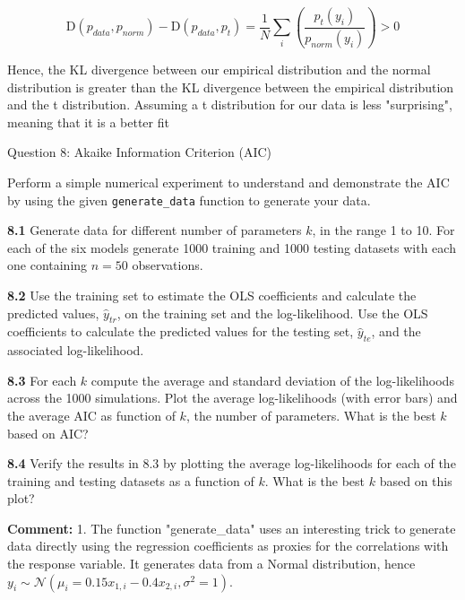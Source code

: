 \documentclass[11pt]{article}
\begin{document}
\[
\text{D}(p_{data},p_{norm}) - \text{D}(p_{data},p_t) = \frac{1}{N}\sum_i\left(\frac{p_t(y_i)}{p_{norm}(y_i)}\right) > 0
\]

Hence, the KL divergence between our empirical distribution and the
normal distribution is greater than the KL divergence between the
empirical distribution and the t distribution. Assuming a t distribution
for our data is less "surprising", meaning that it is a better fit

     Question 8: Akaike Information Criterion (AIC)

Perform a simple numerical experiment to understand and demonstrate the
AIC by using the given \texttt{generate\_data} function to generate your
data.

\textbf{8.1} Generate data for different number of parameters \(k\), in
the range 1 to 10. For each of the six models generate 1000 training and
1000 testing datasets with each one containing \(n=50\) observations.

\textbf{8.2} Use the training set to estimate the OLS coefficients and
calculate the predicted values, \(\hat y_{tr}\), on the training set and
the log-likelihood. Use the OLS coefficients to calculate the predicted
values for the testing set, \(\hat y_{te}\), and the associated
log-likelihood.

\textbf{8.3} For each \(k\) compute the average and standard deviation
of the log-likelihoods across the 1000 simulations. Plot the average
log-likelihoods (with error bars) and the average AIC as function of
\(k\), the number of parameters. What is the best \(k\) based on AIC?

\textbf{8.4} Verify the results in 8.3 by plotting the average
log-likelihoods for each of the training and testing datasets as a
function of \(k\). What is the best \(k\) based on this plot?

\textbf{Comment:} 1. The function "generate\_data" uses an interesting
trick to generate data directly using the regression coefficients as
proxies for the correlations with the response variable. It generates
data from a Normal distribution, hence
\(y_i \sim \mathcal{N}(\mu_i= 0.15 x_{1,i} - 0.4 x_{2,i},\sigma^2=1)\).
\end{document}
